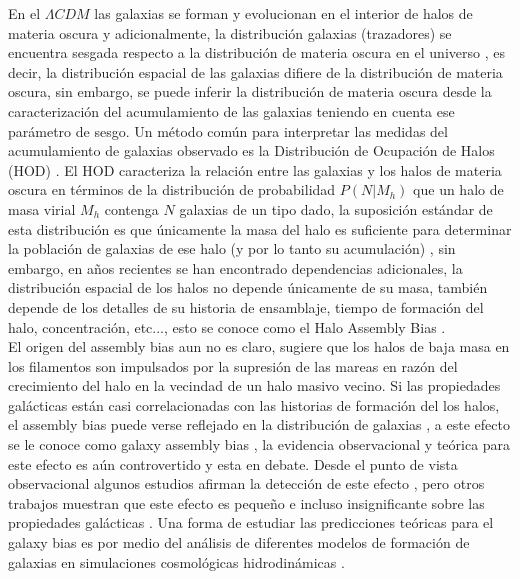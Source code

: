 \documentclass[12pt]{article}
\begin{document}
En el $\Lambda CDM$ las galaxias se forman y evolucionan en el interior de 
halos de materia oscura y adicionalmente, la distribución galaxias (trazadores) 
se encuentra sesgada respecto a la distribución de materia oscura en el 
universo \cite{1984ApJ...284L...9K}, es decir, la distribución espacial de las 
galaxias difiere de la distribución de materia oscura, sin embargo, se puede 
inferir la distribución de materia oscura desde la caracterización del 
acumulamiento de las galaxias teniendo en cuenta ese parámetro de sesgo.  Un 
método común para interpretar las medidas del acumulamiento de galaxias 
observado es la Distribución de Ocupación de Halos (HOD) 
\cite{2000MNRAS.318..203S}\cite{2007ApJ...667..760Z}\cite{2016arXiv161001991V}. 
El HOD caracteriza la relación entre las galaxias y los halos de materia oscura 
en términos de la distribución de probabilidad $P(N|M_h)$ que un halo de masa 
virial $M_h$ contenga $N$ galaxias de un tipo dado, la suposición estándar de 
esta distribución es que únicamente la masa del halo es suficiente para 
determinar la población de galaxias de ese halo (y por lo tanto su acumulación) 
\cite{2016arXiv161001991V}\cite{2018ApJ...853...84Z}, sin embargo, en años 
recientes se han encontrado dependencias adicionales, la distribución espacial 
de los halos no depende únicamente de su masa, también depende de los detalles 
de su historia de ensamblaje, tiempo de formación del halo, concentración, 
etc..., esto se conoce como el Halo Assembly Bias 
\cite{2017ApJ...848...60Y}\cite{doi:10.1111/j.1745-3933.2007.00292.x}\cite{2005MNRAS.363L..66G}\cite{2016PhRvL.116d1301M}.\\


El origen del assembly bias aun no es claro, 
\cite{doi:10.1111/j.1365-2966.2009.15271.x} sugiere que los halos de baja masa 
en los filamentos son impulsados por la supresión de las mareas en razón del 
crecimiento del halo en la vecindad de un halo masivo vecino. Si las 
propiedades galácticas están casi correlacionadas con las historias de 
formación del los halos, el assembly bias puede verse reflejado en la 
distribución de galaxias \cite{2018arXiv180506938A}, a este efecto se le conoce 
como galaxy assembly bias 
\cite{2006ApJ...639L...5Z}\cite{2007MNRAS.374.1303C}\cite{2016MNRAS.460.3100C}, 
la evidencia observacional y teórica para este efecto es aún controvertido y 
esta en debate. Desde el punto de vista observacional algunos estudios afirman 
la detección de este efecto 
\cite{1538-4357-638-2-L55}\cite{2014MNRAS.443.3107L}\cite{2017MNRAS.472.2504T}, 
pero  otros trabajos muestran que este efecto es pequeño e incluso 
insignificante sobre las propiedades galácticas 
\cite{2007ApJ...664..791B}\cite{2017MNRAS.468.3251D}. Una forma de estudiar las 
predicciones teóricas para el galaxy bias es por medio del análisis de 
diferentes modelos de formación de galaxias en simulaciones cosmológicas 
hidrodinámicas \cite{2018arXiv180506938A}.\\
\end{document}
